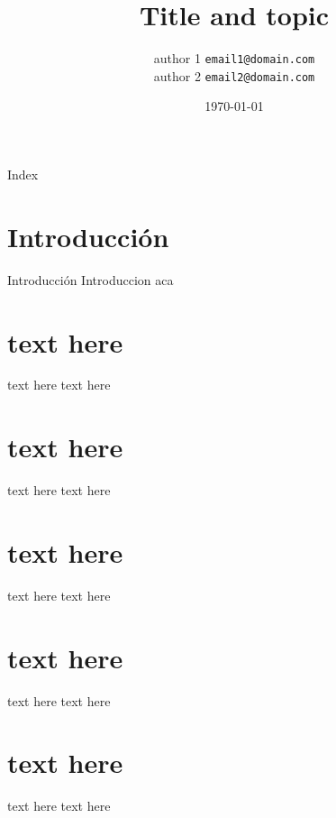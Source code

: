 \documentclass[handout,t]{beamer}
\title[Topic]{Title and topic}
\author[if you want put here who aro you going to present or the name organization]
{author 1 \texttt{email1@domain.com} \\author 2 \texttt{email2@domain.com}\\}
\date{\today}
\begin{document}
\frame{\titlepage}
\section[]{}
\begin{frame}{Index}
  \tableofcontents
\end{frame}
\section{Introducci\'on}
\begin{frame}{Introducci\'on}
	Introduccion aca
\end{frame}
\section{text here}
\begin{frame}{text here}
	text here
\end{frame}
\section{text here}
\begin{frame}{text here}
	text here
\end{frame}
\section{text here}
\begin{frame}{text here}
	text here
\end{frame}
\section{text here}
\begin{frame}{text here}
	text here
\end{frame}
\section{text here}
\begin{frame}{text here}
	text here
\end{frame}
\end{document}
